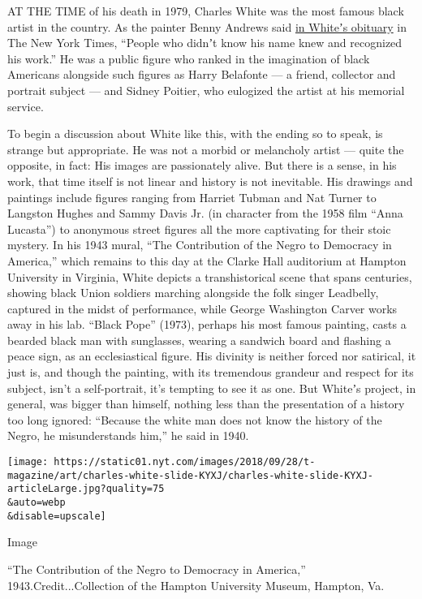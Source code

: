 AT THE TIME of his death in 1979, Charles White was the most famous
black artist in the country. As the painter Benny Andrews said
\href{https://www.nytimes.com/1979/10/06/archives/charles-w-white-is-dead-at-61-artist-with-work-in-49-museums.html}{in
Whiteʼs obituary} in The New York Times, ``People who didnʼt know his
name knew and recognized his work.'' He was a public figure who ranked
in the imagination of black Americans alongside such figures as Harry
Belafonte --- a friend, collector and portrait subject --- and Sidney
Poitier, who eulogized the artist at his memorial service.

To begin a discussion about White like this, with the ending so to
speak, is strange but appropriate. He was not a morbid or melancholy
artist --- quite the opposite, in fact: His images are passionately
alive. But there is a sense, in his work, that time itself is not linear
and history is not inevitable. His drawings and paintings include
figures ranging from Harriet Tubman and Nat Turner to Langston Hughes
and Sammy Davis Jr. (in character from the 1958 film ``Anna Lucasta'')
to anonymous street figures all the more captivating for their stoic
mystery. In his 1943 mural, ``The Contribution of the Negro to Democracy
in America,'' which remains to this day at the Clarke Hall auditorium at
Hampton University in Virginia, White depicts a transhistorical scene
that spans centuries, showing black Union soldiers marching alongside
the folk singer Leadbelly, captured in the midst of performance, while
George Washington Carver works away in his lab. ``Black Pope'' (1973),
perhaps his most famous painting, casts a bearded black man with
sunglasses, wearing a sandwich board and flashing a peace sign, as an
ecclesiastical figure. His divinity is neither forced nor satirical, it
just is, and though the painting, with its tremendous grandeur and
respect for its subject, isn't a self-portrait, it's tempting to see it
as one. But Whiteʼs project, in general, was bigger than himself,
nothing less than the presentation of a history too long ignored:
``Because the white man does not know the history of the Negro, he
misunderstands him,'' he said in 1940.

\texttt{[image: https://static01.nyt.com/images/2018/09/28/t-magazine/art/charles-white-slide-KYXJ/charles-white-slide-KYXJ-articleLarge.jpg?quality=75\\\&auto=webp\\\&disable=upscale]}

Image

``The Contribution of the Negro to Democracy in America,''
1943.Credit...Collection of the Hampton University Museum, Hampton, Va.

